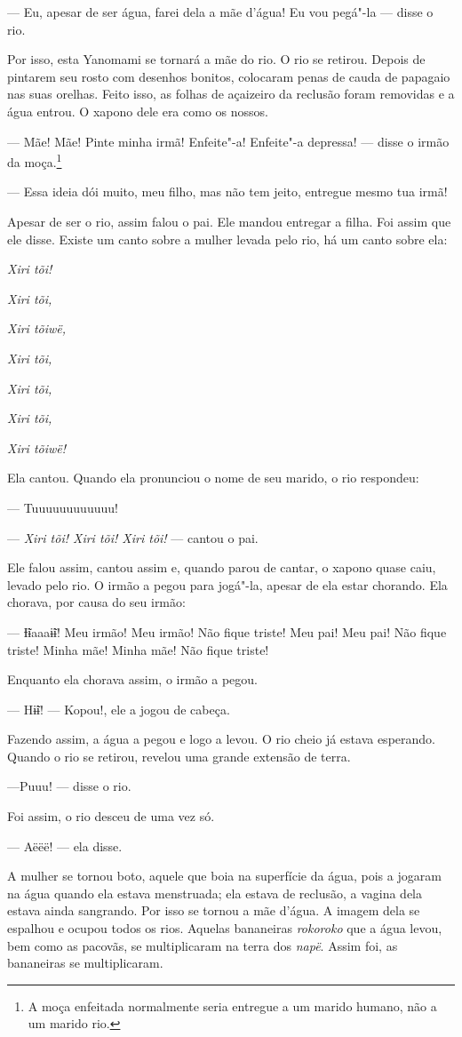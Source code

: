 --- Eu, apesar de ser água, farei dela a mãe d'água! Eu vou pegá"-la ---
disse o rio. 

Por isso, esta Yanomami se tornará a mãe do rio. O rio se retirou.
Depois de pintarem seu rosto com desenhos bonitos, colocaram penas de
cauda de papagaio nas suas orelhas. Feito isso, as folhas de açaizeiro
da reclusão foram removidas e a água entrou. O xapono dele era como os
nossos. 

--- Mãe! Mãe! Pinte minha irmã! Enfeite"-a! Enfeite"-a depressa! --- disse
o irmão da moça.\footnote{  A moça enfeitada normalmente seria entregue a um marido humano, não a um
marido rio.}

--- Essa ideia dói muito, meu filho, mas não tem jeito, entregue mesmo
tua irmã! 

Apesar de ser o rio, assim falou o pai. Ele mandou entregar a filha.
Foi assim que ele disse. Existe um canto sobre a mulher levada pelo rio,
há um canto sobre ela:

\emph{Xiri tõi!} 

\emph{Xiri tõi,} 

\emph{Xiri tõiwë,} 

\emph{Xiri tõi,} 

\emph{Xiri tõi,} 

\emph{Xiri tõi,} 

\emph{Xiri tõiwë!} 

Ela cantou. Quando ela pronunciou o nome de seu marido, o rio
respondeu: 

--- Tuuuuuuuuuuuu!

--- \emph{Xiri tõi! Xiri tõi! Xiri tõi!} --- cantou o pai. 

Ele falou assim, cantou assim e, quando parou de cantar, o xapono quase
caiu, levado pelo rio. O irmão a pegou para jogá"-la, apesar de ela estar
chorando. Ela chorava, por causa do seu irmão: 

--- Ɨ̃ɨaaaɨ̃ɨ! Meu irmão! Meu irmão! Não fique triste! Meu pai! Meu
pai! Não fique triste! Minha mãe! Minha mãe! Não fique triste! 

Enquanto ela chorava assim, o irmão a pegou. 

--- Hɨ̃ɨ! ---  Kopou!, ele a jogou de cabeça. 

Fazendo assim, a água a pegou e logo a levou. O rio cheio já estava
esperando. Quando o rio se retirou, revelou uma grande extensão de
terra. 

---Puuu! --- disse o rio. 

Foi assim, o rio desceu de uma vez só. 

--- Aëëë! --- ela disse. 

A mulher se tornou boto, aquele que boia na superfície da água, pois a
jogaram na água quando ela estava menstruada; ela estava de reclusão, a
vagina dela estava ainda sangrando. Por isso se tornou a mãe d'água. A imagem dela se espalhou e ocupou todos os rios. Aquelas
bananeiras \emph{rokoroko} que a água levou, bem como as pacovãs, se
multiplicaram na terra dos \emph{napë}. Assim foi, as bananeiras se
multiplicaram. 
